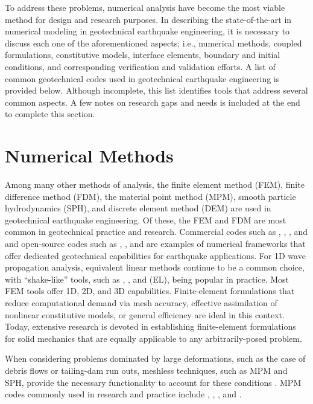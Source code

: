 To address these problems, numerical analysis have become the most viable method for design and research purposes. In describing the state-of-the-art in numerical modeling in geotechnical earthquake engineering, it is necessary to discuss each one of the aforementioned aspects; i.e., numerical methods, coupled formulations, constitutive models, interface elements, boundary and initial conditions, and corresponding verification and validation efforts. A list of common geotechnical codes used in geotechnical earthquake engineering is provided below. Although incomplete, this list identifies tools that address several common aspects. A few notes on research gaps and needs is included at the end to complete this section. 

\section{Numerical Methods}
\label{sec:resp_geotech_1}

Among many other methods of analysis, the finite element method (FEM), finite difference method (FDM), the material point method (MPM), smooth particle hydrodynamics (SPH), and discrete element method (DEM) are used in geotechnical earthquake engineering. Of these, the FEM and FDM are most common in geotechnical practice and research. Commercial codes such as , , , and  and open-source codes such as , , and  are examples of numerical frameworks that offer dedicated geotechnical capabilities for earthquake applications. For 1D wave propagation analysis, equivalent linear methods continue to be a common choice, with ``shake-like'' tools, such as , , and  (EL), being popular in practice. Most FEM tools offer 1D, 2D, and 3D capabilities. Finite-element formulations that reduce computational demand via mesh accuracy, effective assimilation of nonlinear constitutive models, or general efficiency \citep{McGann12, McGann15} are ideal in this context. Today, extensive research is devoted in establishing finite-element formulations for solid mechanics that are equally applicable to any arbitrarily-posed problem.

When considering problems dominated by large deformations, such as the case of debris flows or tailing-dam run outs, meshless techniques, such as MPM and SPH, provide the necessary functionality to account for these conditions \citep{Mast15}. MPM codes commonly used in research and practice include , , , and .

